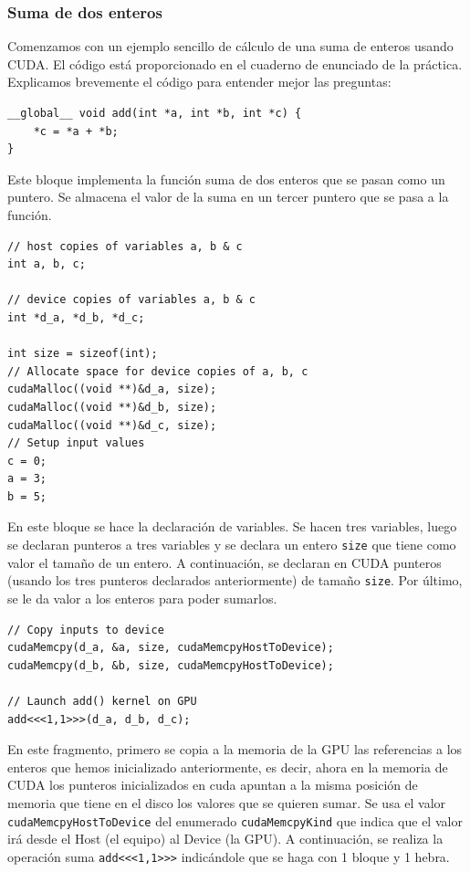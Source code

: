 \documentclass[11pt]{article}
\def\inline{\lstinline[basicstyle=\ttfamily,keywordstyle={}]}
\theoremstyle{plain}
\newcounter{enunciado}
\begin{document}
\subsubsection{Suma de dos enteros}

Comenzamos con un ejemplo sencillo de cálculo de una suma de enteros usando CUDA. El código está proporcionado en el cuaderno de enunciado de la práctica. Explicamos brevemente el código para entender mejor las preguntas:

\begin{verbatim}
__global__ void add(int *a, int *b, int *c) {
	*c = *a + *b;
}
\end{verbatim}
Este bloque implementa la función suma de dos enteros que se pasan como un puntero. Se almacena el valor de la suma en un tercer puntero que se pasa a la función.

\begin{verbatim}
// host copies of variables a, b & c
int a, b, c;

// device copies of variables a, b & c  
int *d_a, *d_b, *d_c;

int size = sizeof(int);
// Allocate space for device copies of a, b, c
cudaMalloc((void **)&d_a, size);
cudaMalloc((void **)&d_b, size);
cudaMalloc((void **)&d_c, size);
// Setup input values  
c = 0;
a = 3;
b = 5;
\end{verbatim}

En este bloque se hace la declaración de variables. Se hacen tres variables, luego se declaran punteros a tres variables y se declara un entero \inline{size} que tiene como valor el tamaño de un entero. A continuación, se declaran en CUDA punteros (usando los tres punteros declarados anteriormente) de tamaño \inline{size}. Por último, se le da valor a los enteros para poder sumarlos.

\begin{verbatim}
// Copy inputs to device
cudaMemcpy(d_a, &a, size, cudaMemcpyHostToDevice);
cudaMemcpy(d_b, &b, size, cudaMemcpyHostToDevice);

// Launch add() kernel on GPU
add<<<1,1>>>(d_a, d_b, d_c);  
\end{verbatim}

En este fragmento, primero se copia a la memoria de la GPU las referencias a los enteros que hemos inicializado anteriormente, es decir, ahora en la memoria de CUDA los punteros inicializados en cuda apuntan a la misma posición de memoria que tiene en el disco los valores que se quieren sumar. Se usa el valor \inline{cudaMemcpyHostToDevice} del enumerado \inline{cudaMemcpyKind} que indica que el valor irá desde el Host (el equipo) al Device (la GPU). A continuación, se realiza la operación suma \inline{add<<<1,1>>>} indicándole que se haga con 1 bloque y 1 hebra. 
\end{document}
